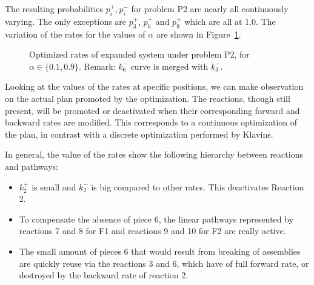         The resulting probabilities $p_i^+, p_i^-$ for problem P2 are nearly all continuously varying. The only exceptions are $p_3^+$, $p_6^+$ and $p_9^+$ which are all at $1.0$. The variation of the rates for the values of $\alpha$ are shown in Figure~\ref{fig:exp_optim_varying_rates}.

        \begin{figure}[h!]
            \centering
            \caption{Optimized rates of expanded system under problem P2, for $\alpha \in \{0.1, 0.9\}$. Remark: $k_6^-$ curve is merged with $k_3^-$.}
        \label{fig:exp_optim_varying_rates} %
        \end{figure}

        Looking at the values of the rates at specific positions, we can make observation on the actual plan promoted by the optimization. The reactions, though still present, will be promoted or deactivated when their corresponding forward and backward rates are modified. This corresponds to a continuous optimization of the plan, in contrast with a discrete optimization performed by Klavins\cite{Klavins:2007p2600}.

        In general, the value of the rates show the following hierarchy between reactions and pathways:
        \begin{itemize}
            \item $k_2^+$ is small and $k_2^-$ is big compared to other rates. This deactivates Reaction 2.
            \item To compensate the absence of piece 6, the linear pathways represented by reactions 7 and 8 for F1 and reactions 9 and 10 for F2 are really active.
            \item The small amount of pieces 6 that would result from breaking of assemblies are quickly reuse via the reactions 3 and 6, which have of full forward rate, or destroyed by the backward rate of reaction 2.
        \end{itemize}

